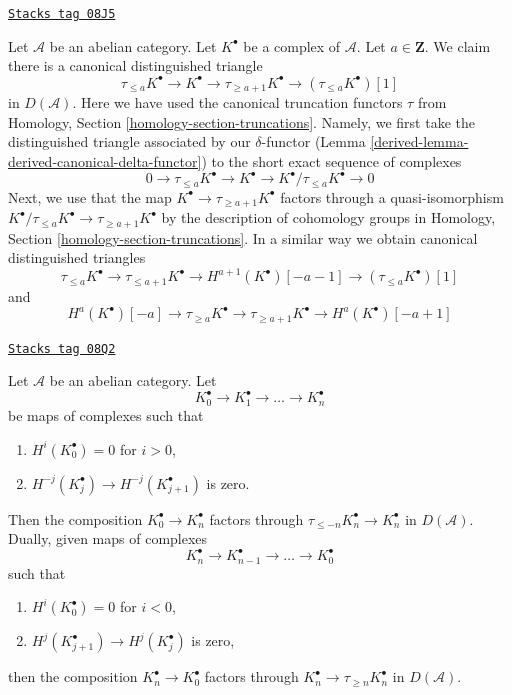 \begin{remark}
\label{derived-remark-truncation-distinguished-triangle}
\href{https://stacks.math.columbia.edu/tag/08J5}{\texttt{Stacks tag 08J5}}

Let $\mathcal{A}$ be an abelian category. Let $K^\bullet$ be a complex
of $\mathcal{A}$. Let $a \in \mathbf{Z}$. We claim there is a canonical
distinguished triangle
$$
\tau_{\leq a}K^\bullet \to K^\bullet \to \tau_{\geq a + 1}K^\bullet \to
(\tau_{\leq a}K^\bullet)[1]
$$
in $D(\mathcal{A})$. Here we have used the canonical truncation functors $\tau$
from Homology, Section \ref{homology-section-truncations}.
Namely, we first take the distinguished
triangle associated by our $\delta$-functor
(Lemma \ref{derived-lemma-derived-canonical-delta-functor})
to the short exact sequence of complexes
$$
0 \to \tau_{\leq a}K^\bullet \to K^\bullet \to
K^\bullet/\tau_{\leq a}K^\bullet \to 0
$$
Next, we use that the map $K^\bullet \to \tau_{\geq a + 1}K^\bullet$
factors through a quasi-isomorphism
$K^\bullet/\tau_{\leq a}K^\bullet \to \tau_{\geq a + 1}K^\bullet$
by the description of cohomology groups in
Homology, Section \ref{homology-section-truncations}.
In a similar way we obtain canonical distinguished triangles
$$
\tau_{\leq a}K^\bullet \to \tau_{\leq a + 1}K^\bullet \to
H^{a + 1}(K^\bullet)[-a-1] \to (\tau_{\leq a}K^\bullet)[1]
$$
and
$$
H^a(K^\bullet)[-a] \to \tau_{\geq a}K^\bullet \to \tau_{\geq a + 1}K^\bullet
\to H^a(K^\bullet)[-a + 1]
$$
\end{remark}

\begin{lemma}
\label{derived-lemma-trick-vanishing-composition}
\href{https://stacks.math.columbia.edu/tag/08Q2}{\texttt{Stacks tag 08Q2}}

Let $\mathcal{A}$ be an abelian category. Let
$$
K_0^\bullet \to K_1^\bullet \to \ldots \to K_n^\bullet
$$
be maps of complexes such that
\begin{enumerate}
\item $H^i(K_0^\bullet) = 0$ for $i > 0$,
\item $H^{-j}(K_j^\bullet) \to H^{-j}(K_{j + 1}^\bullet)$ is zero.
\end{enumerate}
Then the composition $K_0^\bullet \to K_n^\bullet$ factors through
$\tau_{\leq -n}K_n^\bullet \to K_n^\bullet$ in $D(\mathcal{A})$.
Dually, given maps of complexes
$$
K_n^\bullet \to K_{n - 1}^\bullet \to \ldots \to K_0^\bullet
$$
such that
\begin{enumerate}
\item $H^i(K_0^\bullet) = 0$ for $i < 0$,
\item $H^j(K_{j + 1}^\bullet) \to H^j(K_j^\bullet)$ is zero,
\end{enumerate}
then the composition $K_n^\bullet \to K_0^\bullet$ factors through
$K_n^\bullet \to \tau_{\geq n}K_n^\bullet$ in $D(\mathcal{A})$.
\end{lemma}

